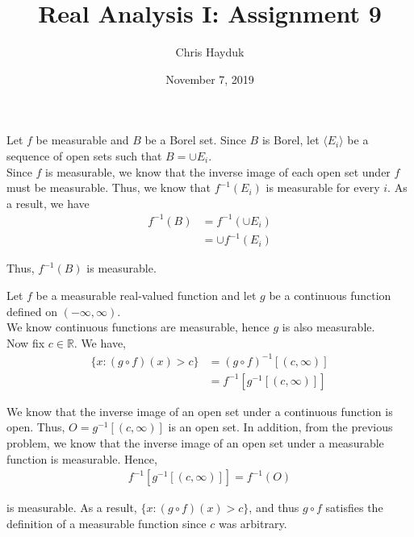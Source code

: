 \documentclass[12pt]{article}
\newenvironment{problem}[2][Problem]{\begin{trivlist}
\item[\hskip \labelsep {\bfseries #1}\hskip \labelsep {\bfseries #2.}]}{\end{trivlist}}
\begin{document}
\title{Real Analysis I: Assignment 9}

\author{Chris Hayduk}
\date{November 7, 2019}

\maketitle

\begin{problem}{1}
\end{problem}

Let $f$ be measurable and $B$ be a Borel set. Since $B$ is Borel, let $\langle E_i \rangle$ be a sequence of open sets such that $B = \cup E_i$.\\

Since $f$ is measurable, we know that the inverse image of each open set under $f$ must be measurable. Thus, we know that $f^{-1}(E_i)$ is measurable for every $i$. As a result, we have
\begin{align*}
f^{-1}(B) &= f^{-1}(\cup E_i)\\
&= \cup f^{-1}(E_i)
\end{align*}

Thus, $f^{-1}(B)$ is measurable.

\begin{problem}{2}
\end{problem}

Let $f$ be a measurable real-valued function and let $g$ be a continuous function defined on $(-\infty, \infty)$.\\

We know continuous functions are measurable, hence $g$ is also measurable.\\

Now fix $c \in \mathbb{R}$. We have,
\begin{align*}
\{x: (g \circ f)(x) > c\} &= (g \circ f)^{-1}[(c, \infty)]\\
&= f^{-1}[g^{-1}[(c, \infty)]]
\end{align*}

We know that the inverse image of an open set under a continuous function is open. Thus, $O = g^{-1}[(c, \infty)]$ is an open set. In addition, from the previous problem, we know that the inverse image of an open set under a measurable function is measurable. Hence,
\begin{align*}
f^{-1}[g^{-1}[(c, \infty)]] = f^{-1}(O)
\end{align*}

is measurable. As a result, $\{x: (g \circ f)(x) > c\}$, and thus $g \circ f$ satisfies the definition of a measurable function since $c$ was arbitrary.
\newpage
\begin{problem}{3}
\end{problem}
\end{document}
